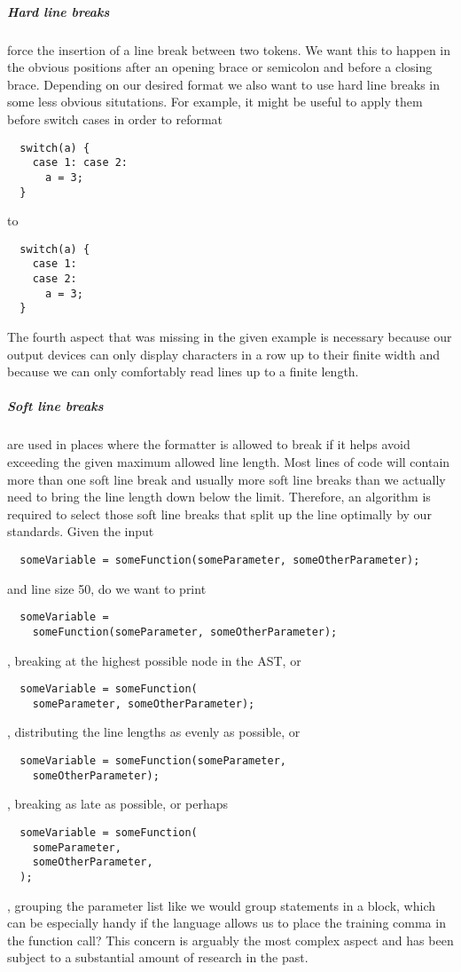 \subparagraph{Hard line breaks} force the insertion of a line break between two tokens.
We want this to happen in the obvious positions after an opening brace or semicolon and before a closing brace.
Depending on our desired format we also want to use hard line breaks in some less obvious situtations.
For example, it might be useful to apply them before switch cases in order to reformat
\begin{verbatim}
  switch(a) {
    case 1: case 2:
      a = 3;
  }
\end{verbatim}
to
\begin{verbatim}
  switch(a) {
    case 1:
    case 2:
      a = 3;
  }
\end{verbatim}

\bigbreak{}
The fourth aspect that was missing in the given example is necessary
because our output devices can only display characters in a row up to their finite width and
because we can only comfortably read lines up to a finite length.
\subparagraph{Soft line breaks} are used in places where the formatter is allowed to break
if it helps avoid exceeding the given maximum allowed line length.
Most lines of code will contain more than one soft line break and usually more soft line breaks
than we actually need to bring the line length down below the limit.
Therefore, an algorithm is required to select those soft line breaks
that split up the line optimally by our standards.
Given the input
\begin{verbatim}
  someVariable = someFunction(someParameter, someOtherParameter);
\end{verbatim}
and line size 50, do we want to print
\begin{verbatim}
  someVariable =
    someFunction(someParameter, someOtherParameter);
\end{verbatim}
, breaking at the highest possible node in the AST, or
\begin{verbatim}
  someVariable = someFunction(
    someParameter, someOtherParameter);
\end{verbatim}
, distributing the line lengths as evenly as possible, or
\begin{verbatim}
  someVariable = someFunction(someParameter,
    someOtherParameter);
\end{verbatim}
, breaking as late as possible, or perhaps
\begin{verbatim}
  someVariable = someFunction(
    someParameter,
    someOtherParameter,
  );
\end{verbatim}
, grouping the parameter list like we would group statements in a block,
which can be especially handy if the language allows us to place the training comma in the function call?
This concern is arguably the most complex aspect and has been subject to a substantial amount of research in the past.
\autocite{designPrettyPrintingLib}\autocite{prettierPrinter}

